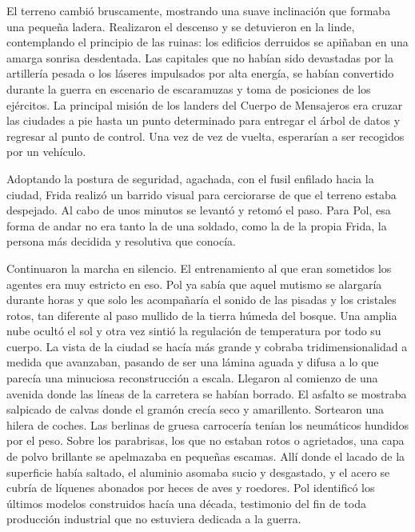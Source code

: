 El terreno cambió bruscamente, mostrando una suave inclinación que formaba una pequeña ladera. Realizaron el descenso y se detuvieron en la linde, contemplando el principio de las ruinas: los edificios derruidos se apiñaban en una amarga sonrisa desdentada. Las capitales que no habían sido devastadas por la artillería pesada o los láseres impulsados por alta energía, se habían convertido durante la guerra en escenario de escaramuzas y toma de posiciones de los ejércitos. La principal misión de los landers del Cuerpo de Mensajeros era cruzar las ciudades a pie hasta un punto determinado para entregar el árbol de datos y regresar al punto de control. Una vez de vez de vuelta, esperarían a ser recogidos por un vehículo. 

Adoptando la postura de seguridad, agachada, con el fusil enfilado hacia la ciudad, Frida realizó un barrido visual para cerciorarse de que el terreno estaba despejado. Al cabo de unos minutos se levantó y retomó el paso. Para Pol, esa forma de andar no era tanto la de una soldado, como la de la propia Frida, la persona más decidida y resolutiva que conocía.

Continuaron la marcha en silencio. El entrenamiento al que eran sometidos los agentes era muy estricto en eso. Pol ya sabía que aquel mutismo se alargaría durante horas y que solo les acompañaría el sonido de las pisadas y los cristales rotos, tan diferente al paso mullido de la tierra húmeda del bosque. Una amplia nube ocultó el sol y otra vez sintió la regulación de temperatura por todo su cuerpo. La vista de la ciudad se hacía más grande y cobraba tridimensionalidad a medida que avanzaban, pasando de ser una lámina aguada y difusa a lo que parecía una minuciosa reconstrucción a escala. Llegaron al comienzo de una avenida donde las líneas de la carretera se habían borrado. El asfalto se mostraba salpicado de calvas donde el gramón crecía seco y amarillento. Sortearon una hilera de coches. Las berlinas de gruesa carrocería tenían los neumáticos hundidos por el peso. Sobre los parabrisas, los que no estaban rotos o agrietados, una capa de polvo brillante se apelmazaba en pequeñas escamas. Allí donde el lacado de la superficie había saltado, el aluminio asomaba sucio y desgastado, y el acero se cubría de líquenes abonados por heces de aves y roedores. Pol identificó los últimos modelos construidos hacía una década, testimonio del fin de toda producción industrial que no estuviera dedicada a la guerra. 

